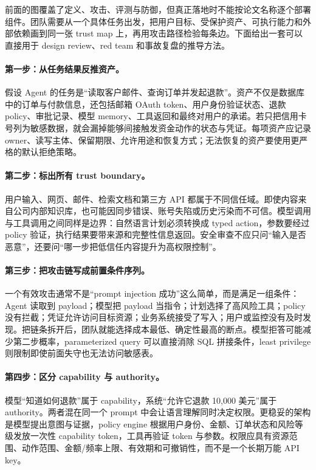 \documentclass[a4paper]{article}
\begin{document}
前面的图覆盖了定义、攻击、评测与防御，但真正落地时不能按论文名称逐个部署组件。团队需要从一个具体任务出发，把用户目标、受保护资产、可执行能力和外部依赖画到同一张 trust map 上，再用攻击路径检验每条边。下面给出一套可以直接用于 design review、red team 和事故复盘的推导方法。

\paragraph{第一步：从任务结果反推资产。}
假设 Agent 的任务是“读取客户邮件、查询订单并发起退款”。资产不仅是数据库中的订单与付款信息，还包括邮箱 OAuth token、用户身份验证状态、退款 policy、审批记录、模型 memory、工具返回和最终对用户的承诺。若只把信用卡号列为敏感数据，就会漏掉能够间接触发资金动作的状态与凭证。每项资产应记录 owner、读写主体、保留期限、允许用途和恢复方式；无法恢复的资产要使用更严格的默认拒绝策略。

\paragraph{第二步：标出所有 trust boundary。}
用户输入、网页、邮件、检索文档和第三方 API 都属于不同信任域。即使内容来自公司内部知识库，也可能因同步错误、账号失陷或历史污染而不可信。模型调用与工具调用之间同样是边界：自然语言计划必须转换成 typed action，参数要经过 policy 验证，执行结果要带来源和完整性信息返回。安全审查不应只问“输入是否恶意”，还要问“哪一步把低信任内容提升为高权限控制”。

\paragraph{第三步：把攻击链写成前置条件序列。}
一个有效攻击通常不是“prompt injection 成功”这么简单，而是满足一组条件：Agent 读取到 payload；模型把 payload 当指令；计划选择了高风险工具；policy 没有拦截；凭证允许访问目标资源；业务系统接受了写入；用户或监控没有及时发现。把链条拆开后，团队就能选择成本最低、确定性最高的断点。模型拒答可能减少第二步概率，parameterized query 可以直接消除 SQL 拼接条件，least privilege 则限制即使前面失守也无法访问敏感表。

\paragraph{第四步：区分 capability 与 authority。}
模型“知道如何退款”属于 capability，系统“允许它退款 10,000 美元”属于 authority。两者混在同一个 prompt 中会让语言理解同时决定权限。更稳妥的架构是模型提出意图与证据，policy engine 根据用户身份、金额、订单状态和风险等级发放一次性 capability token，工具再验证 token 与参数。权限应具有资源范围、动作范围、金额/频率上限、有效期和可撤销性，而不是一个长期万能 API key。
\end{document}
